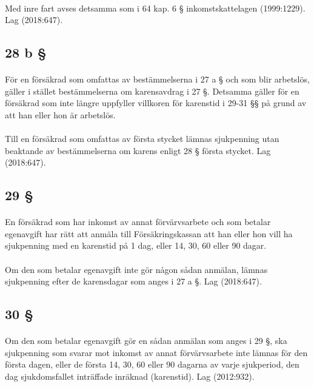 \documentclass[a4paper,notitlepage,openany,10pt]{book}
\begin{document}
\paragraph*{}
Med inre fart avses detsamma som i 64 kap. 6 § inkomstskattelagen (1999:1229).
Lag (2018:647).
\subsection*{28 b §}
\paragraph*{}
För en försäkrad som omfattas av bestämmelserna i 27 a § och som blir arbetslös, gäller i stället bestämmelserna om karensavdrag i 27 §. Detsamma gäller för en försäkrad som inte längre uppfyller villkoren för karenstid i 29-31 §§ på grund av att han eller hon är arbetslös.
\paragraph*{}
Till en försäkrad som omfattas av första stycket lämnas sjukpenning utan beaktande av bestämmelserna om karens enligt 28 § första stycket.
Lag (2018:647).
\subsection*{29 §}
\paragraph*{}
En försäkrad som har inkomst av annat förvärvsarbete och som betalar egenavgift har rätt att anmäla till Försäkringskassan att han eller hon vill ha sjukpenning med en karenstid på 1 dag, eller 14, 30, 60 eller 90 dagar.
\paragraph*{}
Om den som betalar egenavgift inte gör någon sådan anmälan, lämnas sjukpenning efter de karensdagar som anges i 27 a §.
Lag (2018:647).
\subsection*{30 §}
\paragraph*{}
Om den som betalar egenavgift gör en sådan anmälan som anges i 29 §, ska sjukpenning som svarar mot inkomst av annat förvärvsarbete inte lämnas för den första dagen, eller de första 14, 30, 60 eller 90 dagarna av varje sjukperiod, den dag sjukdomsfallet inträffade inräknad (karenstid).
Lag (2012:932).
\end{document}
